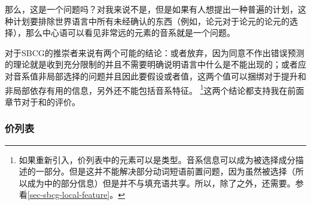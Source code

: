 \addlines
那么，这是一个问题吗？对我来说不是，但是如果有人想提出一种普遍的计划，这种计划要排除世界语言中所有未经确认的东西（例如，论元对于论元的论元的选择），那么中心语可以看见非常远的元素的音系就是一个问题。

对于SBCG的推崇者来说有两个可能的结论：或者放弃\motherfc，因为同意不作出错误预测的理论就是收到充分限制的并且不需要明确说明语言中什么是不能出现的；或者应对音系值非局部选择的问题并且因此要假设\synsemc 或者\localfc 值，这两个值可以捆绑对于提升和非局部依存有用的信息，另外还不能包括音系特征。 \footnote{
如果重新引入\synsemc，价列表中的元素可以是类型。音系信息可以成为被选择成分描述的一部分。但是这并不能解决部分动词短语前置问题，因为\lexfc 虽然被选择（所以成为\synsemc 中的部分信息）但是并不与填充语共享。所以，除了\synsemc 之外，还需要\localfc。参看\ref{sec-sbcg-local-feature}。
}这两个结论都支持我在前面章节对于\motherc 和\localc 的评价。

\subsubsection{价列表}
\label{sec-valence-feature-sbcg}

